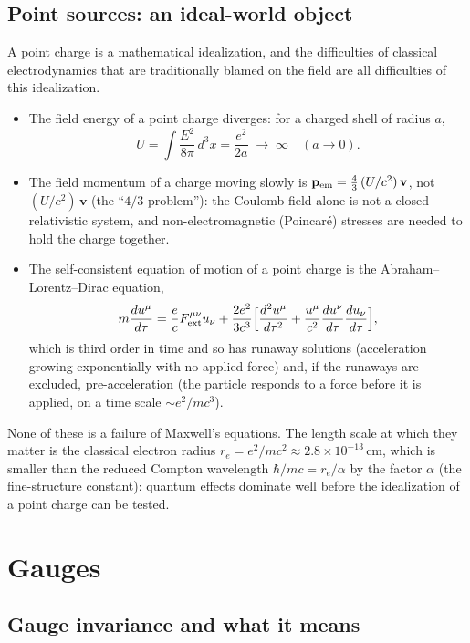\documentclass[11pt,a4paper]{book}
\begin{document}
\subsection{Point sources: an ideal-world object}

A point charge is a mathematical idealization, and the difficulties of classical electrodynamics
that are traditionally blamed on the field are all difficulties of this idealization.
\begin{itemize}
\item The field energy of a point charge diverges: for a charged shell of radius $a$,
\[
U=\int\frac{E^2}{8\pi}\,d^3x=\frac{e^2}{2a}\;\longrightarrow\;\infty\quad(a\to0).
\]
\item The field momentum of a charge moving slowly is $\mathbf p_{\rm em}=\tfrac43\,(U/c^2)\,\mathbf v$,
not $(U/c^2)\,\mathbf v$ (the ``$4/3$ problem''): the Coulomb field alone is not a closed relativistic system,
and non-electromagnetic (Poincar\'e) stresses are needed to hold the charge together.
\item The self-consistent equation of motion of a point charge is the Abraham--Lorentz--Dirac equation,
\begin{equation}
m\frac{du^\mu}{d\tau}=\frac ec F^{\mu\nu}_{\rm ext}u_\nu
+\frac{2e^2}{3c^3}\Bigl[\frac{d^2u^\mu}{d\tau^2}+\frac{u^\mu}{c^2}\frac{du^\nu}{d\tau}\frac{du_\nu}{d\tau}\Bigr],
\end{equation}
which is third order in time and so has runaway solutions (acceleration growing exponentially
with no applied force) and, if the runaways are excluded, pre-acceleration (the particle
responds to a force before it is applied, on a time scale $\sim e^2/mc^3$).
\end{itemize}
None of these is a failure of Maxwell's equations. The length scale at which they matter is the
classical electron radius $r_e=e^2/mc^2\approx2.8\times10^{-13}\,\mathrm{cm}$, which is smaller than
the reduced Compton wavelength $\hbar/mc=r_e/\alpha$ by the factor $\alpha$ (the fine-structure
constant): quantum effects dominate well before the idealization of a point charge can be tested.

\section{Gauges}
\label{sec:gauges}

\subsection{Gauge invariance and what it means}
\end{document}
